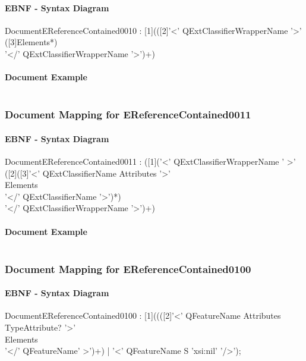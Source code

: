 \documentclass[11pt,a4paper]{article}
\begin{document}
\paragraph{EBNF - Syntax Diagram}
\begin{rail}
DocumentEReferenceContained0010 :
[1](([2]'<' QExtClassifierWrapperName   '>'\\
([3]Elements*) \\
'</' QExtClassifierWrapperName  '>')+)
\end{rail}
\paragraph{Document Example}
\inputminted[fontsize=\footnotesize]{xml}{examples/EReferenceContained0010.xml}

\subsubsection{Document Mapping for EReferenceContained0011}
\paragraph{EBNF - Syntax Diagram}
\begin{rail}
DocumentEReferenceContained0011 :
([1]('<' QExtClassifierWrapperName  ' >'\\
([2]([3]'<' QExtClassifierName  Attributes '>' \\
Elements \\
'</' QExtClassifierName  '>')*) \\
'</' QExtClassifierWrapperName   '>')+)
\end{rail}
\paragraph{Document Example}
\inputminted[fontsize=\footnotesize]{xml}{examples/EReferenceContained0011.xml}

\subsubsection{Document Mapping for EReferenceContained0100}
\paragraph{EBNF - Syntax Diagram}
\begin{rail}
DocumentEReferenceContained0100 : [1]((([2]'<' QFeatureName Attributes \\
TypeAttribute? '>' \\
Elements \\ 
'</' QFeatureName' >')+) 
| '<' QFeatureName S 'xsi:nil' '/>'); 
\end{rail}
\end{document}
